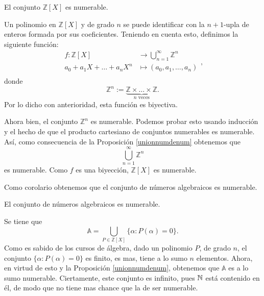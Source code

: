 \begin{lema} El conjunto $\mathbb{Z}[X]$ es numerable.
\end{lema}
\begin{demo} Un polinomio  en $\mathbb{Z}[X]$ y de grado $n$ se puede
identificar con la $n+1$-upla de enteros formada por sus
coeficientes. Teniendo en cuenta esto, definimos la siguiente
función:
\[\begin{split}
          f:\mathbb{Z}[X]&\longrightarrow
            \bigcup_{n=1}^{\infty}\mathbb{Z}^n\\
            a_0+a_1X+\dots+a_nX^n&\longmapsto (a_0,a_1,\dots,
            a_n)\\
            \end{split},
\]
donde
\[\mathbb{Z}^n:=\underbrace{\mathbb{Z}\times\dots\times\mathbb{Z}}_{n\,\,\text{veces}}.\]
Por lo dicho con anterioridad, esta función es biyectiva.

Ahora bien, el conjunto $\mathbb{Z}^n$ es numerable. Podemos
probar esto usando inducción y el hecho de que el producto
cartesiano de conjuntos numerables es numerable. Así, como
consecuencia de la Proposición \vref{unionnumdenum} obtenemos
que
\[\bigcup_{n=1}^{\infty}\mathbb{Z}^n\]
es numerable. Como $f$ es una biyección, $\mathbb{Z}[X]$ es
numerable.
\end{demo}

Como corolario obtenemos que el conjunto de números algebraicos
es numerable.

\begin{corolario}\label{algsonnum}
El conjunto de números algebraicos es numerable.
\end{corolario}
\begin{demo} Se tiene que
\[\mathbb{A}=\bigcup_{P\in\mathbb{Z}[X]}\{\alpha:P(\alpha)=0\}.\]
Como es sabido de los cursos de álgebra, dado un polinomio $P$,
de grado $n$, el conjunto $\{\alpha:P(\alpha)=0\}$ es finito, es
mas, tiene a lo sumo $n$ elementos. Ahora, en virtud de esto y la
Proposición \vref{unionnumdenum}, obtenemos que $\mathbb{A}$ es
a lo sumo numerable. Ciertamente, este conjunto es infinito, pues
$\mathbb{N}$ está contenido en él, de modo que no tiene mas chance
que la de ser numerable.
\end{demo}

